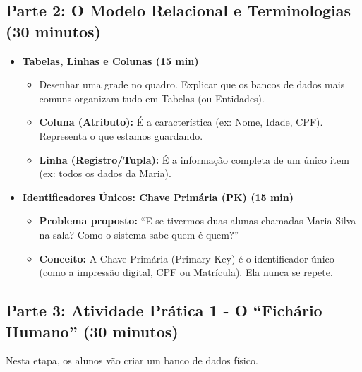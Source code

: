 \documentclass[12pt,a4paper]{article}
\begin{document}
\subsection*{Parte 2: O Modelo Relacional e Terminologias (30 minutos)}
\begin{itemize}[leftmargin=*,itemsep=0.35em]
  \item \textbf{Tabelas, Linhas e Colunas (15 min)}
  \begin{itemize}[leftmargin=*,itemsep=0.25em]
    \item Desenhar uma grade no quadro. Explicar que os bancos de dados mais comuns organizam tudo em Tabelas (ou Entidades).
    \item \textbf{Coluna (Atributo):} É a característica (ex: Nome, Idade, CPF). Representa o que estamos guardando.
    \item \textbf{Linha (Registro/Tupla):} É a informação completa de um único item (ex: todos os dados da Maria).
  \end{itemize}

  \item \textbf{Identificadores Únicos: Chave Primária (PK) (15 min)}
  \begin{itemize}[leftmargin=*,itemsep=0.25em]
    \item \textbf{Problema proposto:} ``E se tivermos duas alunas chamadas Maria Silva na sala? Como o sistema sabe quem é quem?''
    \item \textbf{Conceito:} A Chave Primária (Primary Key) é o identificador único (como a impressão digital, CPF ou Matrícula). Ela nunca se repete.
  \end{itemize}
\end{itemize}

\subsection*{Parte 3: Atividade Prática 1 - O ``Fichário Humano'' (30 minutos)}
Nesta etapa, os alunos vão criar um banco de dados físico.
\end{document}
